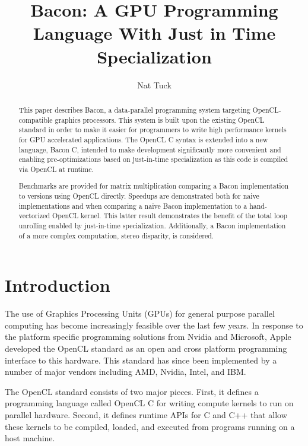 \documentclass{llncs}
\begin{document}
\title{Bacon: A GPU Programming Language With Just in Time Specialization}

\author{Nat Tuck}


\maketitle


\begin{abstract}

This paper describes Bacon, a data-parallel programming system
targeting OpenCL-compatible graphics processors. This system is built
upon the existing OpenCL standard in order to make it easier for
programmers to write high performance kernels for GPU accelerated
applications. The OpenCL C syntax is extended into a new language,
Bacon C, intended to make development significantly more convenient
and enabling pre-optimizations based on just-in-time specialization as
this code is compiled via OpenCL at runtime.

Benchmarks are provided for matrix multiplication comparing a Bacon
implementation to versions using OpenCL directly. Speedups are
demonstrated both for naive implementations and when comparing a naive
Bacon implementation to a hand-vectorized OpenCL kernel. This latter
result demonstrates the benefit of the total loop unrolling enabled by
just-in-time specialization. Additionally, a Bacon implementation of a
more complex computation, stereo disparity, is considered.

\end{abstract}

\section{Introduction}

The use of Graphics Processing Units (GPUs) for general purpose
parallel computing has become increasingly feasible over the last few
years. In response to the platform specific programming solutions from
Nvidia and Microsoft, Apple developed the OpenCL standard as an open
and cross platform programming interface to this hardware. This
standard has since been implemented by a number of major vendors
including AMD, Nvidia, Intel, and IBM.

The OpenCL standard\cite{opencl} consists of two major pieces. First,
it defines a programming language called OpenCL C for writing compute
kernels to run on parallel hardware. Second, it defines runtime APIs
for C and C++ that allow these kernels to be compiled, loaded, and
executed from programs running on a host machine.
\end{document}
